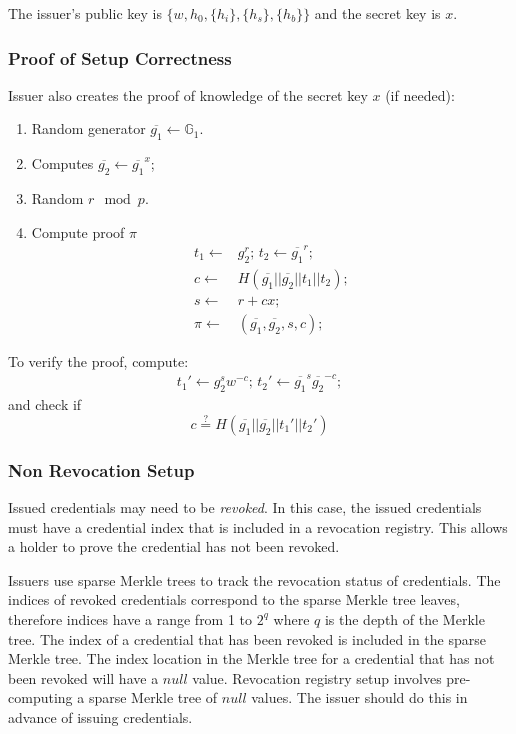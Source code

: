\documentclass[a4paper]{article}
\begin{document}
The issuer's public key is $\{w, h_0, \{h_i\}, \{h_s\}, \{h_b\}\}$ and the secret key is $x$.

\subsubsection{Proof of Setup Correctness}
Issuer also creates the proof of knowledge of the secret key $x$ (if needed):
\begin{enumerate}
    \item Random generator $\overline{g_1} \leftarrow \mathbb{G}_1$.
    \item Computes $\overline{g_2} \leftarrow \overline{g_1}^x$;
    \item Random $r \mod p$.
    \item Compute proof $\pi$ 
    \begin{align*}
        t_1 \leftarrow&g_2^r;\, 
        t_2 \leftarrow \overline{g_1}^r;\\
        c \leftarrow& H(\overline{g_1}||\overline{g_2}||t_1||t_2);\\
        s\leftarrow&r+cx;\\
        \pi\leftarrow& (\overline{g_1},\overline{g_2},s,c);
    \end{align*}
\end{enumerate}
To verify the proof, compute: 
\begin{align*}
t_1' \leftarrow g_2^{s} w^{-c};\,
t_2' \leftarrow \overline{g_1}^{s} \overline{g_2}^{-c};
\end{align*}
and check if
$$
c \overset{\text{?}}{=} H(\overline{g_1}||\overline{g_2}||t_1'||t_2')$$

\subsubsection{Non Revocation Setup}
Issued credentials may need to be \emph{revoked}. In this case, the issued credentials must have a credential index that is included in a revocation registry. This allows a holder to prove the credential has not been revoked. 

Issuers use sparse Merkle trees to track the revocation status of credentials. The indices of revoked credentials correspond to the sparse Merkle tree leaves, therefore indices have a range from 1 to $2^q$ where $q$ is the depth of the Merkle tree. The index of a credential that has been revoked is included in the sparse Merkle tree. The index location in the Merkle tree for a credential that has not been revoked will have a $null$ value. Revocation registry setup involves pre-computing a sparse Merkle tree of $null$ values. The issuer should do this in advance of issuing credentials.
\end{document}
